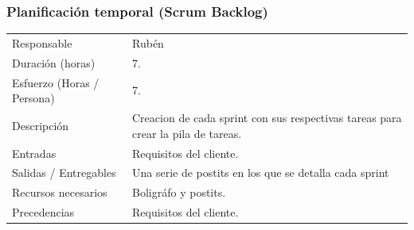 \subsubsection{Planificaci\'{o}n temporal (Scrum Backlog)}
\begin{table}[H]
    \begin{center}
        \begin{tabular}{l p{8cm}}
            Responsable                           & Rub\'{e}n \\
            Duraci\'{o}n (horas)                  & 7. \\ 
            Esfuerzo (Horas / Persona)            & 7. \\
            Descripci\'{o}n                       & Creacion de cada sprint con sus respectivas tareas para crear la pila de tareas. \\
            Entradas                              & Requisitos del cliente.\\
            Salidas / Entregables                 & Una serie de postits en los que se detalla cada sprint \\
            Recursos necesarios                   & Boligr\'{a}fo y postits.\\
            Precedencias                          & Requisitos del cliente. \\
        \end{tabular}
    \end{center}
    
\end{table}

